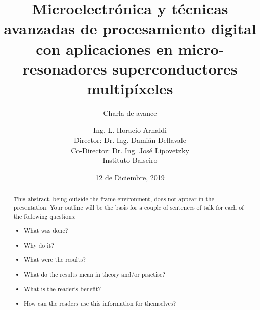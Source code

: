 \documentclass[ignorenonframetext,12pt]{beamer}
\title{Microelectrónica y técnicas avanzadas de procesamiento digital con
aplicaciones en micro-resonadores superconductores multipíxeles}
\subtitle{\alert{Charla de avance}}
\author{Ing. L. Horacio Arnaldi\\
\vspace{0.4cm}
Director: Dr. Ing. Damián Dellavale\\
Co-Director: Dr. Ing. José Lipovetzky\\
\vspace{0.6cm}
Instituto Balseiro}
\date{12 de Diciembre, 2019}
\begin{document}
\begin{frame}
	\maketitle
\end{frame}

\begin{abstract}
	This abstract, being outside the frame environment, does not appear in
	the presentation.  Your outline will be the basis for a couple of
	sentences of talk for each of the following questions:
	\begin{itemize}
		\item What was done?
		\item Why do it?
		\item What were the results?
		\item What do the results mean in theory and/or practise?
		\item What is the reader's benefit?
		\item How can the readers use this information for themselves? 
	\end{itemize}
\end{abstract}


\end{document}
